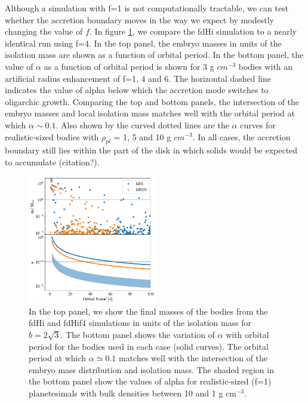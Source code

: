 \documentclass[twocolumn]{aastex63}
\begin{document}
Although a simulation with f=1 is not computationally tractable, we can test whether the accretion boundary moves in the way we expect by modestly changing the value of $f$. In figure \ref{fig:f6f4}, we compare the fdHi simulation to a nearly identical run using f=4. In the top panel, the embryo masses in units of the isolation mass are shown as a function of orbital period. In the bottom panel, the value of $\alpha$ as a function of orbital period is shown for 3 g $cm^{-3}$ bodies with an artificial radius enhancement of f=1, 4 and 6. The horizontal dashed line indicates the value of alpha below which the accretion mode switches to oligarchic growth. Comparing the top and bottom panels, the intersection of the embryo masses and local isolation mass matches well with the orbital period at which $\alpha \sim 0.1$. Also shown by the curved dotted lines are the $\alpha$ curves for realistic-sized bodies with $\rho_{pl}$ = 1, 5 and 10 g $cm^{-3}$. In all cases, the accretion boundary still lies within the part of the disk in which solids would be expected to accumulate (citation?).

\begin{figure}
\begin{center}
    \includegraphics[width=0.5\textwidth]{figures/f6f4.png}
    \caption{In the top panel, we show the final masses of the bodies from the fdHi and fdHif4 simulations in units of the isolation mass for $b = 2\sqrt{3}$. The bottom panel shows the variation of $\alpha$ with orbital period for the bodies used in each case (solid curves). The orbital period at which $\alpha \simeq 0.1$ matches well with the intersection of the embryo mass distribution and isolation mass. The shaded region in the bottom panel show the values of alpha for realistic-sized (f=1) planetesimals with bulk densities between 10 and 1 g cm$^{-3}$.\label{fig:f6f4}}
\end{center}
\end{figure}
\end{document}
